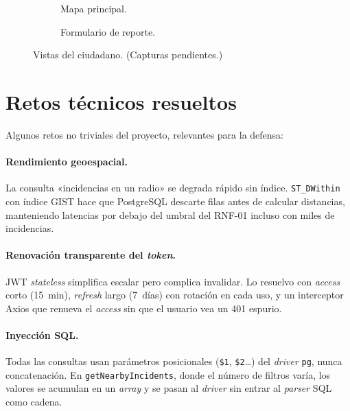 \begin{figure}[H]
  \centering
  \begin{subfigure}[b]{0.48\textwidth}\centering
    \caption{Mapa principal.} \label{fig:ui-mapa}
  \end{subfigure}
  \hfill
  \begin{subfigure}[b]{0.48\textwidth}\centering
    \caption{Formulario de reporte.} \label{fig:ui-reporte}
  \end{subfigure}
  \caption{Vistas del ciudadano. (Capturas pendientes.)}
\end{figure}


\section{Retos técnicos resueltos}
\label{sec:retos}

Algunos retos no triviales del proyecto, relevantes para la defensa:

\paragraph{Rendimiento geoespacial.}  La consulta «incidencias en un radio» se degrada rápido sin índice. \texttt{ST\_DWithin} con índice GIST hace que PostgreSQL descarte filas antes de calcular distancias, manteniendo latencias por debajo del umbral del RNF-01 incluso con miles de incidencias.

\paragraph{Renovación transparente del \textit{token}.}  JWT \textit{stateless} simplifica escalar pero complica invalidar. Lo resuelvo con \textit{access} corto (15~min), \textit{refresh} largo (7~días) con rotación en cada uso, y un interceptor Axios que renueva el \textit{access} sin que el usuario vea un 401 espurio.

\paragraph{Inyección SQL.}  Todas las consultas usan parámetros posicionales (\texttt{\$1}, \texttt{\$2}\dots) del \textit{driver} \texttt{pg}, nunca concatenación. En \texttt{getNearbyIncidents}, donde el número de filtros varía, los valores se acumulan en un \textit{array} y se pasan al \textit{driver} sin entrar al \textit{parser} SQL como cadena.

